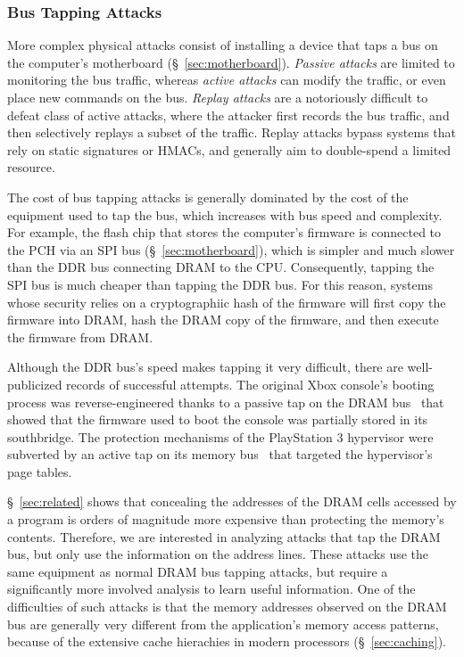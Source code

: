 \subsubsection{Bus Tapping Attacks}
\label{sec:physical_bus_attacks}

More complex physical attacks consist of installing a device that taps a bus on
the computer's motherboard (\S~\ref{sec:motherboard}). \textit{Passive attacks}
are limited to monitoring the bus traffic, whereas \textit{active attacks} can
modify the traffic, or even place new commands on the bus. \textit{Replay
attacks} are a notoriously difficult to defeat class of active attacks, where
the attacker first records the bus traffic, and then selectively replays a
subset of the traffic. Replay attacks bypass systems that rely on static
signatures or HMACs, and generally aim to double-spend a limited resource.

The cost of bus tapping attacks is generally dominated by the cost of the
equipment used to tap the bus, which increases with bus speed and complexity.
For example, the flash chip that stores the computer's firmware is connected to
the PCH via an SPI bus (\S~\ref{sec:motherboard}), which is simpler and much
slower than the DDR bus connecting DRAM to the CPU. Consequently, tapping the
SPI bus is much cheaper than tapping the DDR bus. For this reason, systems
whose security relies on a cryptographiic hash of the firmware will first copy
the firmware into DRAM, hash the DRAM copy of the firmware, and then execute
the firmware from DRAM.

Although the DDR bus's speed makes tapping it very difficult, there are
well-publicized records of successful attempts. The original Xbox console's
booting process was reverse-engineered thanks to a passive tap on the DRAM
bus~\cite{huang2003xbox} that showed that the firmware used to boot the
console was partially stored in its southbridge. The protection mechanisms of
the PlayStation 3 hypervisor were subverted by an active tap on its memory
bus~\cite{hotz2010ps3} that targeted the hypervisor's page tables.

\S~\ref{sec:related} shows that concealing the addresses of the DRAM cells
accessed by a program is orders of magnitude more expensive than protecting the
memory's contents. Therefore, we are interested in analyzing attacks that tap
the DRAM bus, but only use the information on the address lines. These attacks
use the same equipment as normal DRAM bus tapping attacks, but require a
significantly more involved analysis to learn useful information. One of the
difficulties of such attacks is that the memory addresses observed on the DRAM
bus are generally very different from the application's memory access patterns,
because of the extensive cache hierachies in modern processors
(\S~\ref{sec:caching}).

